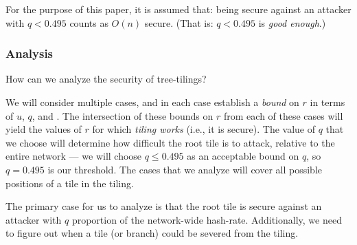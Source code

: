 For the purpose of this paper, it is assumed that: \UTinf{} being secure against an attacker with $q < 0.495$ counts as $O(n)$ secure. (That is: $q < 0.495$ is \emph{good enough}.)

\subsubsection{Analysis}



How can we analyze the security of tree-tilings?

We will consider multiple cases, and in each case establish a \emph{bound} on $r$ in terms of $u$, $q$, and \Mroot.
The intersection of these bounds on $r$ from each of these cases will yield the values of $r$ for which \emph{tiling works} (i.e., it is secure).
The value of $q$ that we choose will determine how difficult the root tile is to attack, relative to the entire network --- we will choose $q \le 0.495$ as an acceptable bound on $q$, so $q=0.495$ is our threshold.
The cases that we analyze will cover all possible positions of a tile in the tiling.

The primary case for us to analyze is that the root tile is secure against an attacker with $q$ proportion of the network-wide hash-rate.
Additionally, we need to figure out when a tile (or branch) could be severed from the tiling.





